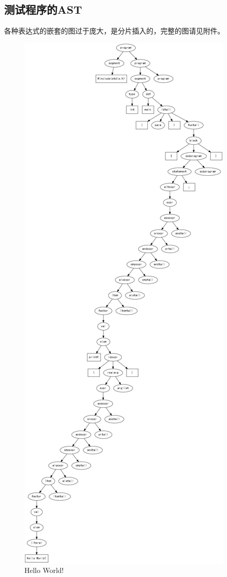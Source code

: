 \documentclass[supercite]{Experimental_Report}
\theoremstyle{definition}
\begin{document}
\subsection{测试程序的AST}
各种表达式的嵌套的图过于庞大，是分片插入的，完整的图请见附件。
\begin{figure}[htb]
	\begin{center}
		\includegraphics[scale=0.2]{images/HelloWorld.pdf}
		\caption{Hello World!}
		\label{fig3-1}
	\end{center}
\end{figure}
\end{document}
